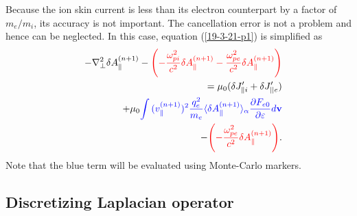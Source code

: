 \documentclass{llncs}
\newcommand{\tmcolor}[2]{{\color{#1}{#2}}}
\begin{document}
Because the ion skin current is less than its electron counterpart by a factor
of $m_e / m_i$, its accuracy is not important. The cancellation error is not a
problem and hence can be neglected. In this case, equation (\ref{19-3-21-p1})
is simplified as
\begin{eqnarray}
  &  & - \nabla^2_{\perp} \delta A_{\parallel}^{(n + 1)} -
  \tmcolor{red}{\left( - \frac{\omega_{p i}^2}{c^2} \delta A_{\parallel}^{(n +
  1)} - \frac{\omega_{p e}^2}{c^2} \delta A_{\parallel}^{(n + 1)} \right)}
  \nonumber\\
  &  & = \mu_0 (\delta J_{\parallel i}' + \delta J'_{||e}) \nonumber\\
  &  & + \mu_0 \tmcolor{blue}{\int {(v_{\parallel}^{(n + 1)})^2} 
  \frac{q^2_e}{m_e} \langle \delta A_{\parallel}^{(n + 1)} \rangle_{\alpha}
  \frac{\partial F_{e 0}}{\partial \varepsilon} d\mathbf{v}} \nonumber\\
  &  & - \tmcolor{red}{\left( - \frac{\omega_{p e}^2}{c^2} \delta
  A_{\parallel}^{(n + 1)} \right)} .  \label{19-3-25-p1}
\end{eqnarray}
Note that the blue term will be evaluated using Monte-Carlo markers.

\subsection{Discretizing Laplacian operator }
\end{document}
